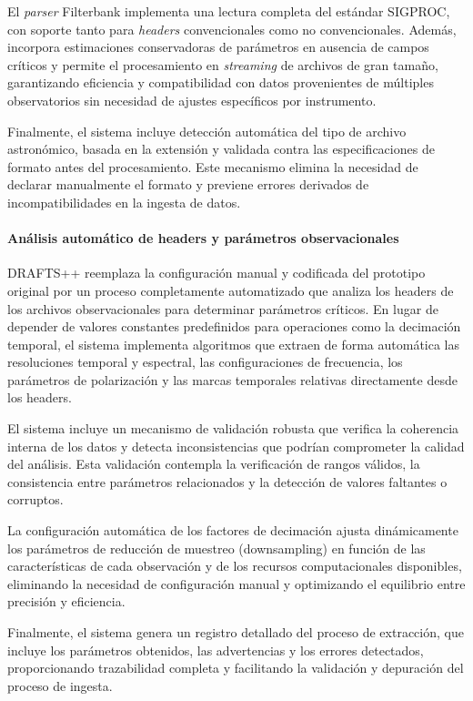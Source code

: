 El \textit{parser} Filterbank implementa una lectura completa del estándar SIGPROC, con soporte tanto para \textit{headers} convencionales como no convencionales. Además, incorpora estimaciones conservadoras de parámetros en ausencia de campos críticos y permite el procesamiento en \textit{streaming} de archivos de gran tamaño, garantizando eficiencia y compatibilidad con datos provenientes de múltiples observatorios sin necesidad de ajustes específicos por instrumento.  

Finalmente, el sistema incluye detección automática del tipo de archivo astronómico, basada en la extensión y validada contra las especificaciones de formato antes del procesamiento. Este mecanismo elimina la necesidad de declarar manualmente el formato y previene errores derivados de incompatibilidades en la ingesta de datos.  

\paragraph{Análisis automático de headers y parámetros observacionales}

DRAFTS++ reemplaza la configuración manual y codificada del prototipo original por un proceso completamente automatizado que analiza los headers de los archivos observacionales para determinar parámetros críticos. En lugar de depender de valores constantes predefinidos para operaciones como la decimación temporal, el sistema implementa algoritmos que extraen de forma automática las resoluciones temporal y espectral, las configuraciones de frecuencia, los parámetros de polarización y las marcas temporales relativas directamente desde los headers.

El sistema incluye un mecanismo de validación robusta que verifica la coherencia interna de los datos y detecta inconsistencias que podrían comprometer la calidad del análisis. Esta validación contempla la verificación de rangos válidos, la consistencia entre parámetros relacionados y la detección de valores faltantes o corruptos.

La configuración automática de los factores de decimación ajusta dinámicamente los parámetros de reducción de muestreo (downsampling) en función de las características de cada observación y de los recursos computacionales disponibles, eliminando la necesidad de configuración manual y optimizando el equilibrio entre precisión y eficiencia.

Finalmente, el sistema genera un registro detallado del proceso de extracción, que incluye los parámetros obtenidos, las advertencias y los errores detectados, proporcionando trazabilidad completa y facilitando la validación y depuración del proceso de ingesta.




